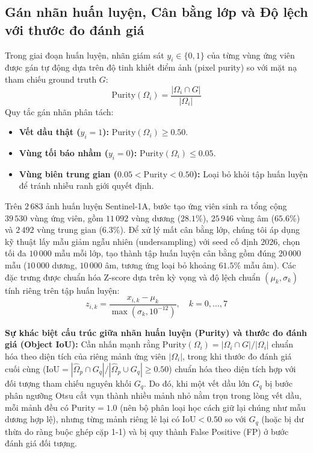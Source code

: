 \subsection{Gán nhãn huấn luyện, Cân bằng lớp và Độ lệch với thước đo đánh giá}
\label{subsec:training_labels}
Trong giai đoạn huấn luyện, nhãn giám sát $y_i \in \{0, 1\}$ của từng vùng ứng viên được gán tự động dựa trên độ tinh khiết điểm ảnh (pixel purity) so với mặt nạ tham chiếu ground truth $G$:
\begin{equation}
\mathrm{Purity}(\Omega_i) = \frac{|\Omega_i \cap G|}{|\Omega_i|}
\end{equation}
Quy tắc gán nhãn phân tách:
\begin{itemize}
    \item \textbf{Vết dầu thật ($y_i = 1$):} $\mathrm{Purity}(\Omega_i) \ge 0.50$.
    \item \textbf{Vùng tối báo nhầm ($y_i = 0$):} $\mathrm{Purity}(\Omega_i) \le 0.05$.
    \item \textbf{Vùng biên trung gian ($0.05 < \mathrm{Purity} < 0.50$):} Loại bỏ khỏi tập huấn luyện để tránh nhiễu ranh giới quyết định.
\end{itemize}

Trên $2\,683$ ảnh huấn luyện Sentinel-1A, bước tạo ứng viên sinh ra tổng cộng $39\,530$ vùng ứng viên, gồm $11\,092$ vùng dương ($28.1\%$), $25\,946$ vùng âm ($65.6\%$) và $2\,492$ vùng trung gian ($6.3\%$). Để xử lý mất cân bằng lớp, chúng tôi áp dụng kỹ thuật lấy mẫu giảm ngẫu nhiên (undersampling) với seed cố định $2026$, chọn tối đa $10\,000$ mẫu mỗi lớp, tạo thành tập huấn luyện cân bằng gồm đúng $20\,000$ mẫu ($10\,000$ dương, $10\,000$ âm, tương ứng loại bỏ khoảng $61.5\%$ mẫu âm). Các đặc trưng được chuẩn hóa Z-score dựa trên kỳ vọng và độ lệch chuẩn $(\mu_k, \sigma_k)$ tính riêng trên tập huấn luyện:
\begin{equation}
z_{i,k} = \frac{x_{i,k} - \mu_k}{\max(\sigma_k, 10^{-12})}, \quad k = 0, \dots, 7
\end{equation}

\noindent\textbf{Sự khác biệt cấu trúc giữa nhãn huấn luyện (Purity) và thước đo đánh giá (Object IoU):}
Cần nhấn mạnh rằng $\mathrm{Purity}(\Omega_i) = |\Omega_i \cap G| / |\Omega_i|$ chuẩn hóa theo diện tích của riêng mảnh ứng viên $|\Omega_i|$, trong khi thước đo đánh giá cuối cùng ($\mathrm{IoU} = |\hat{\Omega}_p \cap G_q| / |\hat{\Omega}_p \cup G_q| \ge 0.50$) chuẩn hóa theo diện tích hợp với đối tượng tham chiếu nguyên khối $G_q$. Do đó, khi một vết dầu lớn $G_q$ bị bước phân ngưỡng Otsu cắt vụn thành nhiều mảnh nhỏ nằm trọn trong lòng vết dầu, mỗi mảnh đều có $\mathrm{Purity} = 1.0$ (nên bộ phân loại học cách giữ lại chúng như mẫu dương hợp lệ), nhưng từng mảnh riêng lẻ lại có $\mathrm{IoU} < 0.50$ so với $G_q$ (hoặc bị dư thừa do ràng buộc ghép cặp 1-1) và bị quy thành False Positive (FP) ở bước đánh giá đối tượng.

